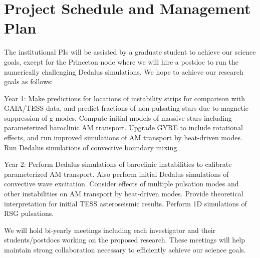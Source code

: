\section{Project Schedule and Management Plan}

The institutional PIs will be assisted by a graduate student to achieve our science goals, except for the Princeton node where we will hire a postdoc to run the numerically challenging Dedalus simulations. We hope to achieve our research goals as follows:

Year 1: Make predictions for locations of instability strips for comparison with GAIA/TESS data, and predict fractions of non-pulsating stars due to magnetic suppression of g modes. Compute initial models of massive stars including parameterized baroclinic AM transport. Upgrade GYRE to include rotational effects, and run improved simulations of AM transport by heat-driven modes. Run Dedalus simulations of convective boundary mixing.

Year 2: Perform Dedalus simulations of baroclinic instabilities to calibrate parameterized AM transport. Also perform initial Dedalus simulations of convective wave excitation. Consider effects of multiple pulsation modes and other instabilities on AM transport by heat-driven modes. Provide theoretical interpretation for initial TESS asteroseismic results. Perform 1D simulations of RSG pulsations.



We will  hold bi-yearly meetings including each investigator and their students/postdocs working on the proposed research. These meetings will help maintain strong collaboration necessary to efficiently achieve our science goals.
